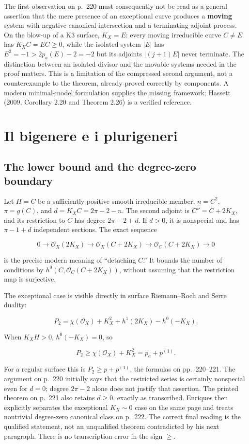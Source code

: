 The first observation on p.~220 must consequently not be read as a general assertion that the mere presence of an exceptional curve produces a \textbf{moving} system with negative canonical intersection and a terminating adjoint process. On the blow-up of a K3 surface, \(K_X=E\): every moving irreducible curve \(C\ne E\) has \(K_X C=EC\geq0\), while the isolated system \(|E|\) has \(E^2=-1>2p_a(E)-2=-2\) but its adjoints \(|(j+1)E|\) never terminate. The distinction between an isolated divisor and the movable systems needed in the proof matters. This is a limitation of the compressed second argument, not a counterexample to the theorem, already proved correctly by components. A modern minimal-model formulation supplies the missing framework; Hassett (2009, Corollary 2.20 and Theorem 2.26) is a verified reference.

\section{Il bigenere e i plurigeneri}
\label{cp1-vi-2}

\subsection{The lower bound and the degree-zero boundary}

Let \(H=C\) be a sufficiently positive smooth irreducible member, \(n=C^2\), \(\pi=g(C)\), and \(d=K_X C=2\pi-2-n\). The second adjoint is \(C''=C+2K_X\), and its restriction to \(C\) has degree \(2\pi-2+d\). If \(d>0\), it is nonspecial and has \(\pi-1+d\) independent sections. The exact sequence

\[
0\longrightarrow\mathcal O_X(2K_X)\longrightarrow
\mathcal O_X(C+2K_X)\longrightarrow
\mathcal O_C(C+2K_X)\longrightarrow0
\]

is the precise modern meaning of ``detaching \(C\).'' It bounds the number of conditions by \(h^0(C,\mathcal O_C(C+2K_X))\), without assuming that the restriction map is surjective.

The exceptional case is visible directly in surface Riemann--Roch and Serre duality:

\[
P_2=\chi(\mathcal O_X)+K_X^2+h^1(2K_X)-h^0(-K_X).
\tag{VI-RR2}
\]

When \(K_X H>0\), \(h^0(-K_X)=0\), so

\[
P_2\geq\chi(\mathcal O_X)+K_X^2=p_a+p^{(1)}.
\]

For a regular surface this is \(P_2\geq p+p^{(1)}\), the formulas on pp.~220--221. The argument on p.~220 initially says that the restricted series is certainly nonspecial even for \(d=0\); degree \(2\pi-2\) alone does not justify that assertion. The printed theorem on p.~221 also retains \(d\geq0\), exactly as transcribed. Enriques then explicitly separates the exceptional \(K_X\sim0\) case on the same page and treats nontrivial degree-zero canonical class on p.~222. The correct final reading is the qualified statement, not an unqualified theorem contradicted by his next paragraph. There is no transcription error in the sign \(\geq\).

